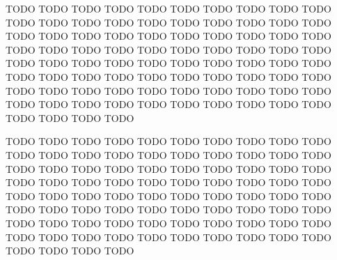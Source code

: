 TODO TODO TODO TODO TODO TODO TODO TODO TODO TODO TODO TODO
TODO TODO TODO TODO TODO TODO TODO TODO TODO TODO TODO TODO
TODO TODO TODO TODO TODO TODO TODO TODO TODO TODO TODO TODO
TODO TODO TODO TODO TODO TODO TODO TODO TODO TODO TODO TODO
TODO TODO TODO TODO TODO TODO TODO TODO TODO TODO TODO TODO
TODO TODO TODO TODO TODO TODO TODO TODO TODO TODO TODO TODO
TODO TODO TODO TODO TODO TODO TODO TODO TODO TODO TODO TODO

TODO TODO TODO TODO TODO TODO TODO TODO TODO TODO TODO TODO
TODO TODO TODO TODO TODO TODO TODO TODO TODO TODO TODO TODO
TODO TODO TODO TODO TODO TODO TODO TODO TODO TODO TODO TODO
TODO TODO TODO TODO TODO TODO TODO TODO TODO TODO TODO TODO
TODO TODO TODO TODO TODO TODO TODO TODO TODO TODO TODO TODO
TODO TODO TODO TODO TODO TODO TODO TODO TODO TODO TODO TODO
TODO TODO TODO TODO TODO TODO TODO TODO TODO TODO TODO TODO

